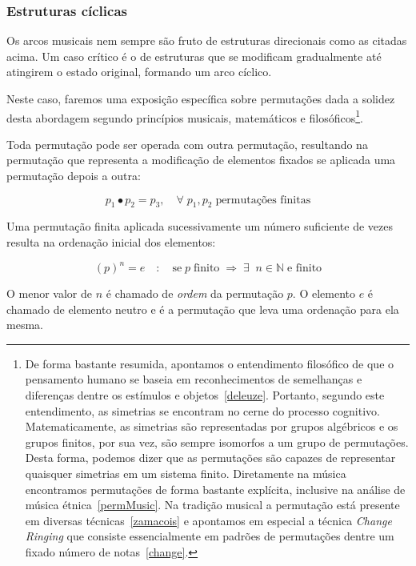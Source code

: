 \subsubsection{Estruturas cíclicas}
Os arcos musicais nem sempre são fruto de estruturas direcionais como as citadas
acima. Um caso crítico é o de estruturas que se modificam gradualmente
até atingirem o estado original, formando um arco cíclico.

Neste caso, faremos uma exposição específica sobre permutações dada
a solidez desta abordagem segundo princípios musicais, matemáticos e
filosóficos\footnote{De forma bastante resumida, apontamos o
entendimento filosófico de que o pensamento humano se baseia
em reconhecimentos de semelhanças e diferenças dentre os estímulos
e objetos~\ref{deleuze}. Portanto, segundo este entendimento,
as simetrias se encontram no cerne do processo cognitivo. Matematicamente,
as simetrias são representadas por grupos algébricos e os grupos finitos, por sua vez,
são sempre isomorfos a um grupo de permutações. Desta forma, podemos dizer que
as permutações são capazes de representar quaisquer simetrias em um sistema finito.
Diretamente na música encontramos permutações de forma bastante explícita, inclusive
na análise de música étnica~\ref{permMusic}.
Na tradição musical a permutação está presente em diversas técnicas~\ref{zamacois} e
apontamos em especial a técnica \emph{Change Ringing} que consiste essencialmente
em padrões de permutações dentre um fixado número de notas~\ref{change}.}.

Toda permutação pode ser operada com outra permutação, resultando na permutação
que representa a modificação de elementos fixados se aplicada uma permutação
depois a outra:

\begin{equation}
p_1 \bullet p_2 = p_3, \quad \forall \; p_1, p_2 \; \text{permutações finitas}
\end{equation}

Uma permutação finita aplicada sucessivamente um número suficiente de vezes
resulta na ordenação inicial dos elementos:

\begin{equation}
(p)^n = e \quad : \quad \text{se} \; p \; \text{finito} \; \Rightarrow \; \exists \;\; n  \in \mathbb{N} \; \text{e finito}
\end{equation}

O menor valor de $n$ é chamado de \emph{ordem} da permutação $p$. O elemento $e$ é chamado de elemento neutro e é
a permutação que leva uma ordenação para ela mesma.


